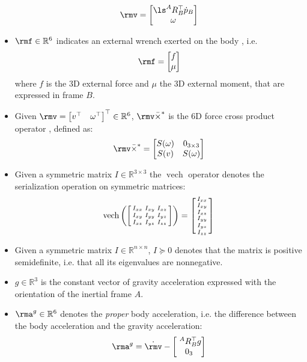 \begin{itemize}
$$
\rmv = \begin{bmatrix} \ls^A R_B^\top \dot{p}_B \\ \omega \end{bmatrix}$$
\item $\rmf \in \mathbb{R}^6$ indicates an external wrench exerted on the body \cite[Chapter 3]{murray1994mathematical}, i.e. 
$$\rmf = \begin{bmatrix} f \\ \mu \end{bmatrix}$$
where $f$ is the 3D external force and $\mu$ the 3D external moment, that are expressed in frame $B$. 
\item Given $\rmv = \begin{bmatrix} v^\top & \omega^\top \end{bmatrix}^\top \in \mathbb{R}^6$,  $\rmv \bar \times^*$ is the 6D force cross product operator \cite{featherstone2008}, defined as:
$$
\rmv \bar \times^* 
= 
\begin{bmatrix}
S(\omega) & 0_{3\times3} \\
S(v)      & S(\omega) 
\end{bmatrix}
$$
\item Given a symmetric matrix $I \in \mathbb{R}^{3\times3}$ the $\operatorname{vech}$ operator denotes the serialization operation on symmetric matrices:
$$
\operatorname{vech} \left(
\begin{bsmallmatrix}
I_{xx} & I_{xy} & I_{xz} \\
I_{xy} & I_{yy} & I_{yz} \\
I_{xz} & I_{yz} & I_{zz}
\end{bsmallmatrix} \right)
=
\begin{bsmallmatrix}
I_{xx} \\
I_{xy} \\
I_{xz} \\
I_{yy} \\
I_{yz} \\
I_{zz}
\end{bsmallmatrix}
$$
\item Given a symmetric matrix $I \in \mathbb{R}^{n\times n}$, $I \succeq 0$ denotes that the matrix is positive semidefinite, i.e. that all its eigenvalues are nonnegative.  
\item $ g \in \mathbb{R}^3$ is the constant vector of gravity acceleration expressed with the orientation of the inertial frame $A$.
\item $\rma^g \in \mathbb{R}^6$ denotes the \emph{proper} body acceleration, i.e. the difference between the body acceleration and the gravity acceleration:
$$
\rma^g = \dot{\rmv} - \begin{bmatrix} ~^A R_B^\top g \\ 0_{3} \end{bmatrix}
$$
\end{itemize}